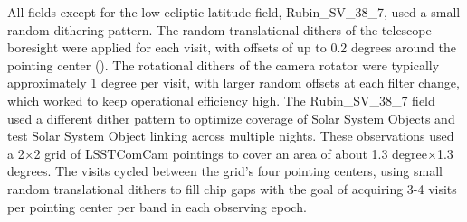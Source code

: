 All fields except for the low ecliptic latitude field, Rubin\_SV\_38\_7, used a small random dithering pattern.
The random translational dithers of the telescope boresight were applied for each visit, with offsets of up to 0.2 degrees around the pointing center ().
The rotational dithers of the camera rotator were typically approximately 1 degree per visit, with larger random offsets at each filter change, which worked to keep operational efficiency high.
The Rubin\_SV\_38\_7 field used a different dither pattern to optimize coverage of Solar System Objects and test Solar System Object linking across multiple nights.
These observations used a 2$\times$2 grid of \gls{LSSTComCam} pointings to cover an area of about 1.3 degree$\times$1.3 degrees.
The visits cycled between the grid's four pointing centers, using small random translational dithers to fill chip gaps with the goal of acquiring 3-4 visits per pointing center per band in each observing epoch.
%
